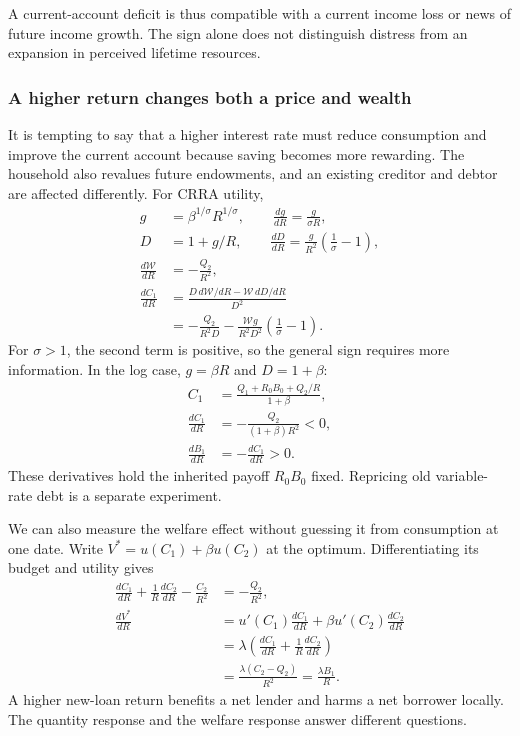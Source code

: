 A current-account deficit is thus compatible with a current income loss or
news of future income growth. The sign alone does not distinguish distress
from an expansion in perceived lifetime resources.

\subsubsection{A higher return changes both a price and wealth}

It is tempting to say that a higher interest rate must reduce consumption
and improve the current account because saving becomes more rewarding.
The household also revalues future endowments, and an existing creditor
and debtor are affected differently. For CRRA utility,
\begin{align}
 g&=\beta^{1/\sigma}R^{1/\sigma},\qquad
 \frac{dg}{dR}=\frac{g}{\sigma R},\\
 D&=1+g/R,\qquad
 \frac{dD}{dR}=\frac{g}{R^2}\left(\frac1\sigma-1\right),\\
 \frac{d\mathcal W}{dR}&=-\frac{Q_2}{R^2},\\
 \frac{dC_1}{dR}
 &=\frac{D\,d\mathcal W/dR-\mathcal W\,dD/dR}{D^2}\\
 &=-\frac{Q_2}{R^2D}
   -\frac{\mathcal W g}{R^2D^2}\left(\frac1\sigma-1\right).
\end{align}
For $\sigma>1$, the second term is positive, so the general sign requires
more information. In the log case, $g=\beta R$ and $D=1+\beta$:
\begin{align}
 C_1&=\frac{Q_1+R_0B_0+Q_2/R}{1+\beta},\\
 \frac{dC_1}{dR}&=-\frac{Q_2}{(1+\beta)R^2}<0,\\
 \frac{dB_1}{dR}&=-\frac{dC_1}{dR}>0.
\end{align}
These derivatives hold the inherited payoff $R_0B_0$ fixed. Repricing old
variable-rate debt is a separate experiment.

We can also measure the welfare effect without guessing it from consumption
at one date. Write $V^*=u(C_1)+\beta u(C_2)$ at the optimum. Differentiating
its budget and utility gives
\begin{align}
 \frac{dC_1}{dR}+\frac1R\frac{dC_2}{dR}-\frac{C_2}{R^2}
 &=-\frac{Q_2}{R^2},\\
 \frac{dV^*}{dR}
 &=u'(C_1)\frac{dC_1}{dR}+\beta u'(C_2)\frac{dC_2}{dR}\\
 &=\lambda\left(\frac{dC_1}{dR}+\frac1R\frac{dC_2}{dR}\right)\\
 &=\frac{\lambda(C_2-Q_2)}{R^2}=\frac{\lambda B_1}{R}.
\end{align}
A higher new-loan return benefits a net lender and harms a net borrower
locally. The quantity response and the welfare response answer different
questions.


